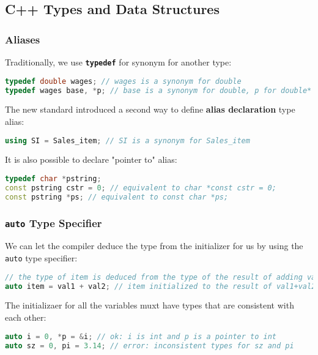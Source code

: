 \subsection{C++ Types and Data Structures}
\label{task:20231122_cpp}

\subsubsection{Aliases}

Traditionally, we use \textbf{\texttt{typedef}} for synonym for another type:
\begin{lstlisting}[language=C++]
typedef double wages; // wages is a synonym for double 
typedef wages base, *p; // base is a synonym for double, p for double*
\end{lstlisting}


The new standard introduced a second way to define \textbf{alias declaration} type alias:
\begin{lstlisting}[language=C++]
using SI = Sales_item; // SI is a synonym for Sales_item
\end{lstlisting}

It is also possible to declare "pointer to" alias:
\begin{lstlisting}[language=C++]
typedef char *pstring; 
const pstring cstr = 0; // equivalent to char *const cstr = 0; 
const pstring *ps; // equivalent to const char *ps;
\end{lstlisting}

\subsubsection{\texttt{auto} Type Specifier}

We can let the compiler deduce the type from the initializer for us by using the \texttt{auto} type specifier:
\begin{lstlisting}[language=C++]
// the type of item is deduced from the type of the result of adding val1 and val2 
auto item = val1 + val2; // item initialized to the result of val1+val2
\end{lstlisting}

The initializaer for all the variables muxt have types that are consistent with each other:
\begin{lstlisting}[language=C++]
auto i = 0, *p = &i; // ok: i is int and p is a pointer to int 
auto sz = 0, pi = 3.14; // error: inconsistent types for sz and pi
\end{lstlisting}

